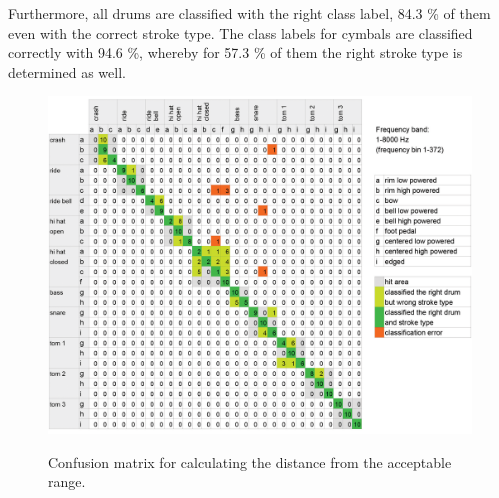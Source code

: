 Furthermore, all drums are classified with the right class label, 84.3 \% of them even with the correct stroke type. The class labels for cymbals are classified correctly with 94.6 \%, whereby for 57.3 \% of them the right stroke type is determined as well.






\begin{figure}[htb]
	\centering
	\includegraphics[width=\textwidth]{images/classification_matrix/matrix_test_3.png}
	\label{}
	\caption{Confusion matrix for calculating the distance from the acceptable range.}
	\label{fig:matrix3}
\end{figure}

%

